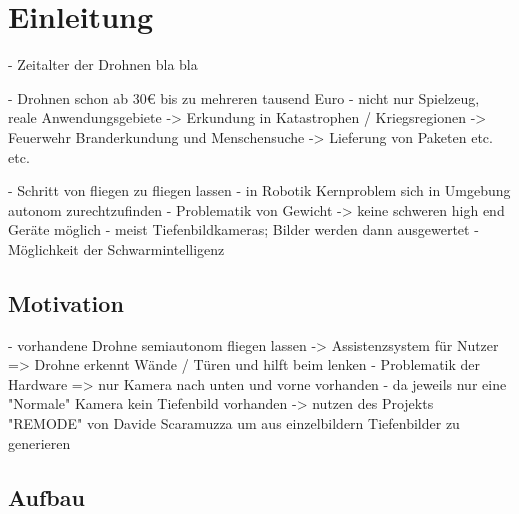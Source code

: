 

\pagestyle{plain}
\chapter{Einleitung}
\label{cha:Introduction}

- Zeitalter der Drohnen bla bla

- Drohnen schon ab 30€ bis zu mehreren tausend Euro
- nicht nur Spielzeug, reale Anwendungsgebiete
-> Erkundung in Katastrophen / Kriegsregionen
-> Feuerwehr Branderkundung und Menschensuche
-> Lieferung von Paketen etc. etc.

- Schritt von fliegen zu fliegen lassen
- in Robotik Kernproblem sich in Umgebung autonom zurechtzufinden
- Problematik von Gewicht -> keine schweren high end Geräte möglich
- meist Tiefenbildkameras; Bilder werden dann ausgewertet
- Möglichkeit der Schwarmintelligenz

\section{Motivation}

- vorhandene Drohne semiautonom fliegen lassen
-> Assistenzsystem für Nutzer => Drohne erkennt Wände / Türen und hilft beim lenken
- Problematik der Hardware => nur Kamera nach unten und vorne vorhanden
- da jeweils nur eine "Normale" Kamera kein Tiefenbild vorhanden
-> nutzen des Projekts "REMODE" von Davide Scaramuzza um aus einzelbildern Tiefenbilder zu generieren


\section{Aufbau}
